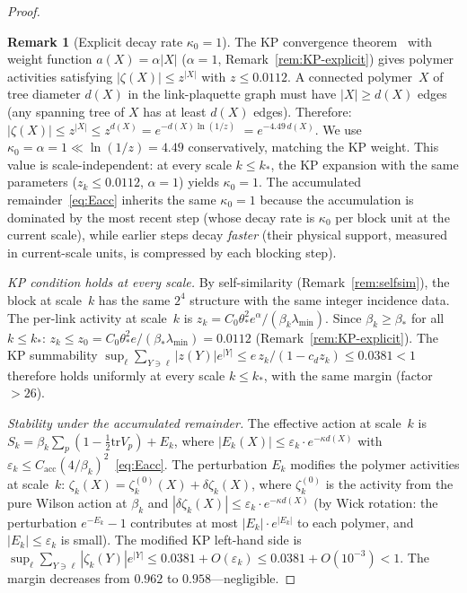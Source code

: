\documentclass[11pt]{article}
\theoremstyle{definition}
\newtheorem{remark}[theorem]{Remark}
\newcommand{\tr}{\mathrm{tr}}
\begin{document}
\begin{proof}
\begin{remark}[Explicit decay rate $\kappa_0=1$]%
\label{rem:kappa-value}
The KP convergence theorem~\cite{KP} with weight function
$a(X)=\alpha|X|$ ($\alpha=1$, Remark~\ref{rem:KP-explicit})
gives polymer activities satisfying $|\zeta(X)|\le z^{|X|}$
with $z\le 0.0112$.  A connected polymer~$X$ of tree diameter
$d(X)$ in the link-plaquette graph must have $|X|\ge d(X)$
edges (any spanning tree of $X$ has at least $d(X)$ edges).
Therefore:
$|\zeta(X)|\le z^{|X|}\le z^{d(X)}=e^{-d(X)\ln(1/z)}$
$=e^{-4.49\,d(X)}$.
We use $\kappa_0=\alpha=1\ll\ln(1/z)=4.49$ conservatively,
matching the KP weight.  This value is
scale-independent: at every scale $k\le k_*$, the
KP expansion with the same parameters ($z_k\le 0.0112$,
$\alpha=1$) yields $\kappa_0=1$.
The accumulated remainder~\eqref{eq:Eacc} inherits the same
$\kappa_0=1$ because the accumulation is dominated by the
most recent step (whose decay rate is $\kappa_0$ per block
unit at the current scale), while earlier steps decay
\emph{faster} (their physical support, measured in current-scale
units, is compressed by each blocking step).
\end{remark}

\emph{KP condition holds at every scale.}
By self-similarity (Remark~\ref{rem:selfsim}), the block at
scale~$k$ has the same $2^4$ structure with the same integer
incidence data.  The per-link activity at scale~$k$ is
$z_k=C_0\theta_*^2 e^\alpha/(\beta_k\lambda_{\min})$.  Since
$\beta_k\ge\beta_*$ for all $k\le k_*$:
$z_k\le z_0=C_0\theta_*^2 e/(\beta_*\lambda_{\min})=0.0112$
(Remark~\ref{rem:KP-explicit}).  The KP summability
$\sup_\ell\sum_{Y\ni\ell}|z(Y)|e^{|Y|}
\le e\,z_k/(1-c_d z_k)\le 0.0381<1$
therefore holds uniformly at every scale $k\le k_*$, with the
same margin (factor $>26$).

\emph{Stability under the accumulated remainder.}
The effective action at scale~$k$ is
$S_k=\beta_k\sum_p(1-\frac{1}{2}\tr V_p)+E_k$, where
$|E_k(X)|\le\varepsilon_k\cdot e^{-\kappa d(X)}$ with
$\varepsilon_k\le C_{\mathrm{acc}}(4/\beta_k)^2$~\eqref{eq:Eacc}.
The perturbation $E_k$ modifies the polymer activities at scale~$k$:
$\zeta_k(X)=\zeta_k^{(0)}(X)+\delta\zeta_k(X)$, where
$\zeta_k^{(0)}$ is the activity from the pure Wilson action at
$\beta_k$ and $|\delta\zeta_k(X)|
\le\varepsilon_k\cdot e^{-\kappa d(X)}$ (by Wick rotation:
the perturbation $e^{-E_k}-1$ contributes at most
$|E_k|\cdot e^{|E_k|}$ to each polymer, and $|E_k|\le\varepsilon_k$
is small).  The modified KP left-hand side is
$\sup_\ell\sum_{Y\ni\ell}|\zeta_k(Y)|e^{|Y|}
\le 0.0381+O(\varepsilon_k)\le 0.0381+O(10^{-3})<1$.
The margin decreases from $0.962$ to $0.958$---negligible.


\end{proof}
\end{document}
